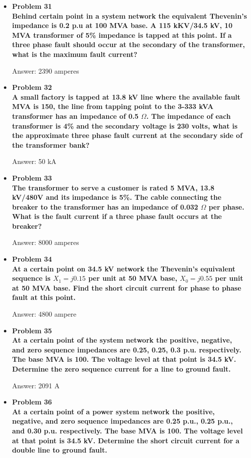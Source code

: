 \documentclass{article}
\begin{document}
\begin{center}
\begin{itemize}
    \item\textbf{Problem 31\\
    Behind certain point in a system network the equivalent Thevenin's impedance is 0.2 p.u at 100 MVA base. A 115 kKV/34.5 kV, 10 MVA transformer of 5\% impedance is tapped  at this point. If a three phase fault should occur at the secondary of the transformer, what is the maximum fault current?}

    Answer: 2390 amperes

    \item\textbf{Problem 32\\
    A small factory is tapped at 13.8 kV line where the available fault MVA is 150, the line from tapping point to the 3-333 kVA transformer has an impedance of 0.5 $\Omega$. The impedance of each transformer is 4\% and the secondary voltage is 230 volts, what is the approximate three phase fault current at the secondary side of the transformer bank?}

    Answer: 50 kA

    \item\textbf{Problem 33\\
    The transformer to serve a customer is rated 5 MVA, 13.8 kV/480V and its impedance is 5\%. The cable connecting the breaker to the transformer has an impedance of 0.032 $\Omega$ per phase. What is the fault current if a three phase fault occurs at the breaker?}

    Answer: 8000 amperes

    \item\textbf{Problem 34\\
    At a certain point on 34.5 kV network the Thevenin's equivalent sequence is $X_1=j0.15$ per unit at 50 MVA base, $X_0=j0.55$ per unit at 50 MVA base. Find the short circuit current for phase to phase fault at this point.}

    Answer: 4800 ampere

    \item\textbf{Problem 35\\
    At a certain point of the system network the positive, negative, and zero sequence impedances are 0.25, 0.25, 0.3 p.u. respectively. The base MVA is 100. The voltage level at that point is 34.5 kV. Determine the zero sequence current for a line to ground fault.}

    Answer: 2091 A

    \item\textbf{Problem 36\\
    At a certain point of a power system network the positive, negative, and zero sequence impedances are 0.25 p.u., 0.25 p.u., and 0.30 p.u. respectively. The base MVA is 100. The voltage level at that point is 34.5 kV. Determine the short circuit current for a double line to ground fault.}


\end{itemize}
\end{center}
\end{document}
